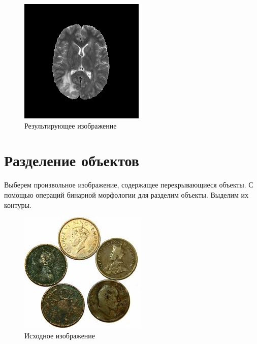 \begin{figure}[H]
    \includegraphics[width=\textwidth]{../outputs/1_res.png}
    \caption{Результирующее изображение}
\end{figure}




\section{Разделение объектов}

Выберем произвольное изображение, содержащее перекрывающиеся объекты. С помощью операций бинарной морфологии для разделим объекты. Выделим их контуры.

\begin{figure}[H]
    \includegraphics[width=\textwidth]{../source/3.png}
    \caption{Исходное изображение}
\end{figure}

